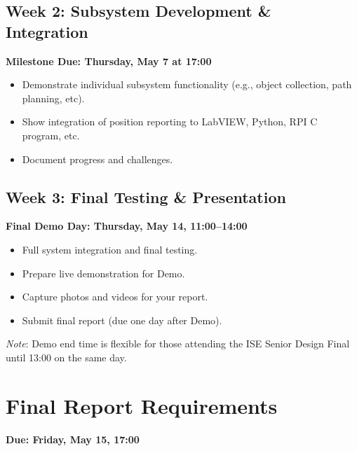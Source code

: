 \documentclass[11pt]{article}
\begin{document}
\subsection*{Week 2: Subsystem Development \& Integration}
%
\begin{checkoff}
        \textbf{Milestone Due: Thursday, May 7 at 17:00}
        \begin{itemize}
            \item Demonstrate individual subsystem functionality (e.g., object collection, path planning, etc).
            \item Show integration of position reporting to LabVIEW, Python, RPI C program, etc.
            \item Document progress and challenges.
        \end{itemize}
\end{checkoff}

\subsection*{Week 3: Final Testing \& Presentation}
%
\begin{checkoff}
        \textbf{Final Demo Day: Thursday, May 14, 11:00–14:00}
        \begin{itemize}
            \item Full system integration and final testing.
            \item Prepare live demonstration for Demo.
            \item Capture photos and videos for your report.
            \item Submit final report (due one day after Demo).
        \end{itemize}
\end{checkoff}
%
\emph{Note}: Demo end time is flexible for those attending the ISE Senior Design Final until 13:00 on the same day.

\section*{Final Report Requirements}

\textbf{Due: Friday, May 15, 17:00}
\end{document}
